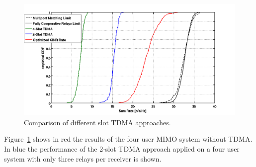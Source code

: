 \begin{figure}[h]
\centering
  \includegraphics[width=\linewidth]{images/SlotTDMAcomparison_edited.png}
\caption{Comparison of different slot TDMA approaches.}
\label{fig:tdma_comb}
\end{figure}


Figure~\ref{fig:tdma_comb} shows in red the results of the four user MIMO system without TDMA.
In blue the performance of the 2-slot TDMA approach applied on a four user system with only three relays per receiver is shown.







